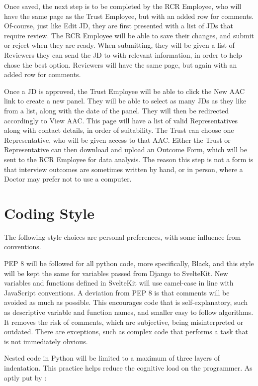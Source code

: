 Once saved, the next step is to be completed by the RCR Employee, who will have the same page as the Trust Employee, but with an added row for comments. Of-course, just like Edit JD, they are first presented with a list of JDs that require review. The RCR Employee will be able to save their changes, and submit or reject when they are ready. When submitting, they will be given a list of Reviewers they can send the JD to with relevant information, in order to help chose the best option. Reviewers will have the same page, but again with an added row for comments. 

Once a JD is approved, the Trust Employee will be able to click the New AAC link to create a new panel. They will be able to select as many JDs as they like from a list, along with the date of the panel. They will then be redirected accordingly to View AAC. This page will have a list of valid Representatives along with contact details, in order of suitability. The Trust can choose one Representative, who will be given access to that AAC. Either the Trust or Representative can then download and upload an Outcome Form, which will be sent to the RCR Employee for data analysis. The reason this step is not a form is that interview outcomes are sometimes written by hand, or in person, where a Doctor may prefer not to use a computer.

\clearpage
\section{Coding Style}
The following style choices are personal preferences, with some influence from conventions. 

PEP 8 \parencite{guido_van_rossum_pep_2013} will be followed for all python code, more specifically, Black, and this style will be kept the same for variables passed from Django to SvelteKit. New variables and functions defined in SvelteKit will use camel-case in line with JavaScript conventions. A deviation from PEP 8 is that comments will be avoided as much as possible. This encourages code that is self-explanatory, such as descriptive variable and function names, and smaller easy to follow algorithms. It removes the risk of comments, which are subjective, being misinterpreted or outdated. There are exceptions, such as complex code that performs a task that is not immediately obvious.

Nested code in Python will be limited to a maximum of three layers of indentation. This practice helps reduce the cognitive load on the programmer. As aptly put by \textcite{the_kernel_development_community_linux_2024}:

